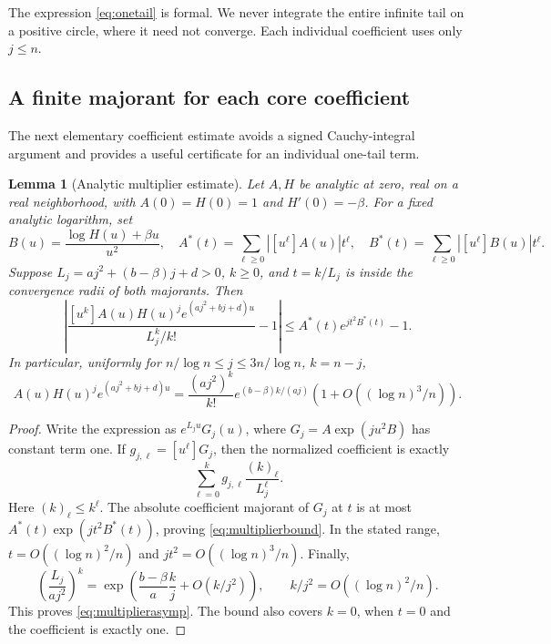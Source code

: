 \documentclass[11pt,a4paper]{article}
\numberwithin{equation}{section}
\newtheorem{lemma}[theorem]{Lemma}
\theoremstyle{definition}\newtheorem{definition}[theorem]{Definition}
\theoremstyle{remark}\newtheorem{remark}[theorem]{Remark}
\theoremstyle{definition}
\begin{document}
The expression \eqref{eq:onetail} is formal. We never integrate the entire
infinite tail on a positive circle, where it need not converge. Each
individual coefficient uses only \(j\le n\).

\subsection{A finite majorant for each core coefficient}
The next elementary coefficient estimate avoids a signed Cauchy-integral
argument and provides a useful certificate for an individual one-tail term.

\begin{lemma}[Analytic multiplier estimate]
\label{lem:multiplier}
Let \(A,H\) be analytic at zero, real on a real neighborhood, with
\(A(0)=H(0)=1\) and \(H'(0)=-\beta\). For a fixed analytic logarithm, set
\[
 B(u)=\frac{\log H(u)+\beta u}{u^2},
 \quad A^*(t)=\sum_{\ell\ge0}|[u^\ell]A(u)|t^\ell,
 \quad B^*(t)=\sum_{\ell\ge0}|[u^\ell]B(u)|t^\ell.
\]
Suppose \(L_j=aj^2+(b-\beta)j+d>0\), \(k\ge0\), and
\(t=k/L_j\) is inside the convergence radii of both majorants. Then
\begin{equation}
 \left|\frac{[u^k]A(u)H(u)^je^{(aj^2+bj+d)u}}
                   {L_j^k/k!}-1\right|
 \le A^*(t)e^{jt^2B^*(t)}-1.
 \label{eq:multiplierbound}
\end{equation}
In particular, uniformly for \(n/\log n\le j\le3n/\log n\), \(k=n-j\),
\begin{equation}
 [u^k]A(u)H(u)^je^{(aj^2+bj+d)u}
 =\frac{(aj^2)^k}{k!}
    e^{(b-\beta)k/(aj)}(1+O((\log n)^3/n)).
 \label{eq:multiplierasymp}
\end{equation}
\end{lemma}
\begin{proof}
Write the expression as \(e^{L_ju}G_j(u)\), where
\(G_j=A\exp(ju^2B)\) has constant term one. If \(g_{j,\ell}=[u^\ell]G_j\),
then the normalized coefficient is exactly
\[
 \sum_{\ell=0}^k g_{j,\ell}\frac{(k)_\ell}{L_j^\ell}.
\]
Here \((k)_\ell\le k^\ell\). The absolute coefficient majorant of
\(G_j\) at \(t\) is at most \(A^*(t)\exp(jt^2B^*(t))\), proving
\eqref{eq:multiplierbound}. In the stated range,
\(t=O((\log n)^2/n)\) and \(jt^2=O((\log n)^3/n)\).
Finally,
\[
 \left(\frac{L_j}{aj^2}\right)^k
 =\exp\!\left(\frac{b-\beta}{a}\frac{k}{j}
       +O(k/j^2)\right),\qquad k/j^2=O((\log n)^2/n).
\]
This proves \eqref{eq:multiplierasymp}. The bound also covers \(k=0\),
when \(t=0\) and the coefficient is exactly one.
\end{proof}
\end{document}
